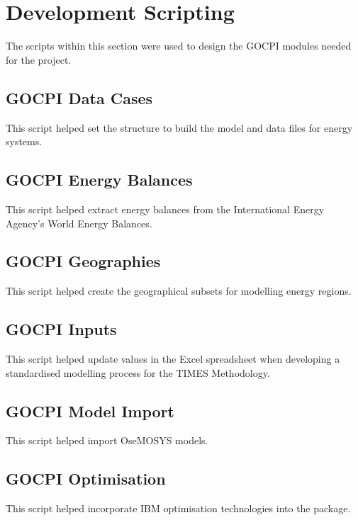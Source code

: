 \documentclass[12pt]{article}
\begin{document}
\section{Development Scripting}
The scripts within this section were used to design the GOCPI modules needed for the project.
\subsection{GOCPI Data Cases}
This script helped set the structure to build the model and data files for energy systems.

\subsection{GOCPI Energy Balances}
This script helped extract energy balances from the International Energy Agency's World Energy Balances.

\subsection{GOCPI Geographies}
This script helped create the geographical subsets for modelling energy regions.

\subsection{GOCPI Inputs}
This script helped update values in the Excel spreadsheet when developing a standardised modelling process for the TIMES Methodology.

\subsection{GOCPI Model Import}
This script helped import OseMOSYS models.

\subsection{GOCPI Optimisation}
This script helped incorporate IBM optimisation technologies into the package.

\end{document}
